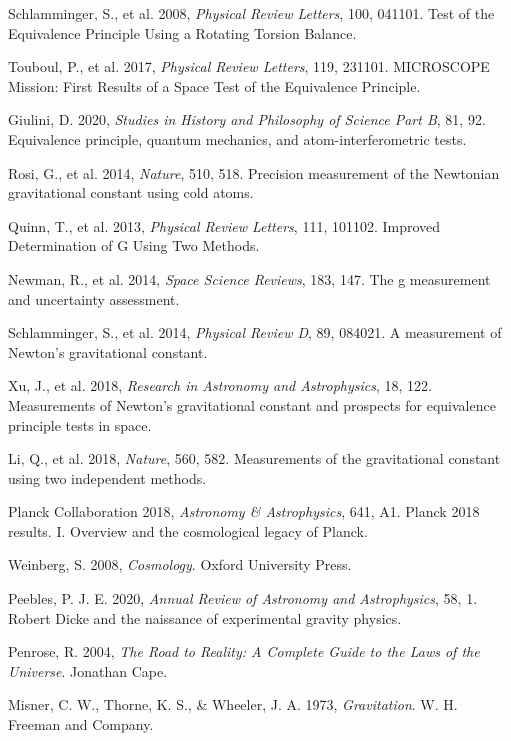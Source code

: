 \documentclass[12pt,a4paper]{article}
\begin{document}
\begin{thebibliography}{99}
 Schlamminger, S., et al. 2008, \textit{Physical Review Letters}, 100, 041101. Test of the Equivalence Principle Using a Rotating Torsion Balance.

 Touboul, P., et al. 2017, \textit{Physical Review Letters}, 119, 231101. MICROSCOPE Mission: First Results of a Space Test of the Equivalence Principle.

 Giulini, D. 2020, \textit{Studies in History and Philosophy of Science Part B}, 81, 92. Equivalence principle, quantum mechanics, and atom-interferometric tests.

 Rosi, G., et al. 2014, \textit{Nature}, 510, 518. Precision measurement of the Newtonian gravitational constant using cold atoms.

 Quinn, T., et al. 2013, \textit{Physical Review Letters}, 111, 101102. Improved Determination of G Using Two Methods.

 Newman, R., et al. 2014, \textit{Space Science Reviews}, 183, 147. The g measurement and uncertainty assessment.

 Schlamminger, S., et al. 2014, \textit{Physical Review D}, 89, 084021. A measurement of Newton's gravitational constant.

 Xu, J., et al. 2018, \textit{Research in Astronomy and Astrophysics}, 18, 122. Measurements of Newton's gravitational constant and prospects for equivalence principle tests in space.

 Li, Q., et al. 2018, \textit{Nature}, 560, 582. Measurements of the gravitational constant using two independent methods.

 Planck Collaboration 2018, \textit{Astronomy \& Astrophysics}, 641, A1. Planck 2018 results. I. Overview and the cosmological legacy of Planck.

 Weinberg, S. 2008, \textit{Cosmology}. Oxford University Press.

 Peebles, P. J. E. 2020, \textit{Annual Review of Astronomy and Astrophysics}, 58, 1. Robert Dicke and the naissance of experimental gravity physics.

 Penrose, R. 2004, \textit{The Road to Reality: A Complete Guide to the Laws of the Universe}. Jonathan Cape.

 Misner, C. W., Thorne, K. S., \& Wheeler, J. A. 1973, \textit{Gravitation}. W. H. Freeman and Company.


\end{thebibliography}
\end{document}
